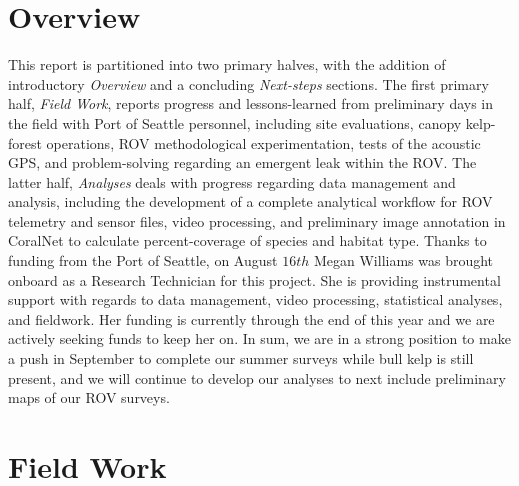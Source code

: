 \documentclass[11pt]{article}
\begin{document}
\section{Overview}
\label{Overview}
This report is partitioned into two primary halves, with the addition of introductory \textit{Overview} and a concluding \textit{Next-steps} sections. 
The first primary half, \textit{Field Work}, reports progress and lessons-learned from preliminary days in the field with Port of Seattle personnel, including site evaluations, canopy kelp-forest operations, ROV methodological experimentation, tests of the acoustic GPS, and problem-solving regarding an emergent leak within the ROV. 
The latter half, \textit{Analyses} deals with progress regarding data management and analysis, including the development of a complete analytical workflow for ROV telemetry and sensor files, video processing, and preliminary image annotation in CoralNet to calculate percent-coverage of species and habitat type.  
Thanks to funding from the Port of Seattle, on August $16th$ Megan 
Williams was brought onboard as a Research Technician for this project. 
She is providing instrumental support with regards to data management, 
video processing, statistical analyses, and fieldwork. 
Her funding is currently through the end of this year and we are 
actively seeking funds to keep her on.  
In sum, we are in a strong position to make a push in September to complete our summer surveys while bull kelp is still present, and we will continue to develop our analyses to next include preliminary maps of our ROV surveys.




\section{Field Work}
\label{Field Work}
\end{document}

